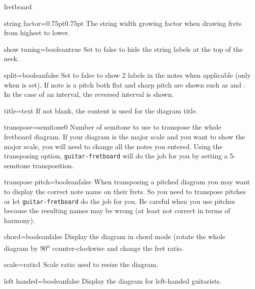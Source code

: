 \documentclass[a4paper]{article}
\newcommand{\pkg}[1]{\texttt{#1}}
\begin{document}
\begin{docEnvironment}{fretboard}{}
  \begin{docKey}[fb][]{string factor}{=0.75pt}{0.75pt}
    The string width growing factor when drawing frets from highest to
    lower.
  \end{docKey}

  \begin{docKey}[fb][]{show tuning}{=boolean}{true}
    Set to false to hide the string labels at the top of the neck.
  \end{docKey}
  
  \begin{docKey}[fb][]{split}{=boolean}{false}
    Set to false to show 2 labels in the notes when applicable (only when
     is set). If note is a pitch both flat
    and sharp pitch are shown such as \pEb and \pFS. In the case of an
    interval, the reversed interval is shown.
  \end{docKey}
  
  \begin{docKey}[fb][]{title}{=text}{}
    If not blank, the  content is used for the diagram title.
  \end{docKey}

  \begin{docKey}[fb][]{transpose}{=semitone}{0}
    Number of semitone to use to transpose the whole fretboard diagram. If
    your diagram is the \pC major scale and you want to show the \pF major
    scale, you will need to change all the notes you entered. Using the
    transposing option, \pkg{guitar-fretboard} will do the job for you by
    setting a 5-semitone transposition.
  \end{docKey}

  \begin{docKey}[fb][]{transpose pitch}{=boolean}{false}
    When transposing a pitched diagram you may want to display the correct
    note name on their frets. So you need to transpose pitches or let
    \pkg{guitar-fretboard} do the job for you. Be careful when you use
    pitches because the resulting names may be wrong (at least not correct
    in terms of harmony).
  \end{docKey}

  \begin{docKey}[fb][]{chord}{=boolean}{false}
    Display the diagram in chord mode (rotate the whole diagram by
    90\textsuperscript{o} counter-clockwise and change the fret ratio.
  \end{docKey}

  \begin{docKey}[fb][]{scale}{=ratio}{1}
    Scale ratio used to resize the diagram.
  \end{docKey}

  \begin{docKey}[fb][]{left handed}{=boolean}{false}
    Display the diagram for left-handed guitarists.
  \end{docKey}

\end{docEnvironment}
\end{document}
